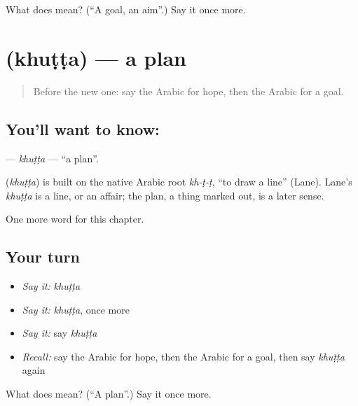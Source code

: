\begin{tcolorbox}[breakable,colback=teal!4,colframe=teal!35!black,title={Before you move on}]
What does  mean? (\textquotedblleft{}A goal, an aim\textquotedblright{}.) Say it once more.
\end{tcolorbox}
\section[\texorpdfstring{\ar{خطة} (khuṭṭa)}{خطة (khuṭṭa)}]{ (khuṭṭa) — a plan}

\label{lesson:AR-C114-khutta}



\begin{quote}
Before the new one: say the Arabic for hope, then the Arabic for a goal.
\end{quote}

\subsection*{You'll want to know: }
\textbf{} — \emph{khuṭṭa} — \textquotedblleft{}a plan\textquotedblright{}.

\begin{cousinweb}
\textbf{} (\emph{khuṭṭa}) is built on the native Arabic root \emph{kh-ṭ-ṭ}, \textquotedblleft{}to draw a line\textquotedblright{} (Lane). Lane's \emph{khuṭṭa} is a line, or an affair; the plan, a thing marked out, is a later sense.
\end{cousinweb}

\begin{grammarlens}[title={What you've built}]
One more word for this chapter.
\end{grammarlens}

\subsection*{Your turn}
\begin{itemize}
\raggedright
  \item \emph{Say it:} \emph{khuṭṭa}
  \item \emph{Say it:} \emph{khuṭṭa}, once more
  \item \emph{Say it:} say \emph{khuṭṭa}
  \item \emph{Recall:} say the Arabic for hope, then the Arabic for a goal, then say \emph{khuṭṭa} again
\end{itemize}

\begin{tcolorbox}[breakable,colback=teal!4,colframe=teal!35!black,title={Before you move on}]
What does  mean? (\textquotedblleft{}A plan\textquotedblright{}.) Say it once more.
\end{tcolorbox}
